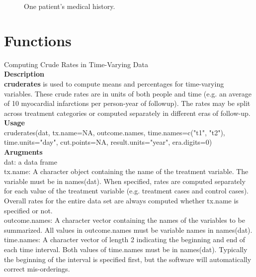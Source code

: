 \documentclass{article}
\begin{document}
\clearpage
\begin{figure}
\begin{center}
\caption{One patient's medical history.}
\label{imagraph}
\end{center}
\end{figure}


\section{Functions}

\huge{Computing Crude Rates in Time-Varying Data}\\

\large{\textbf{Description}}\\

\textbf{cruderates} is used to compute means and percentages for time-varying variables.  These crude rates are in units of both people and time (e.g. an average of 10 myocardial infarctions per person-year of followup).  The rates may be split across treatment categories or computed separately in different eras of follow-up.\\

\large{\textbf{Usage}}\\

cruderates(dat, tx.name=NA, outcome.names, time.names=c("t1", "t2"), time.units="day", cut.points=NA, result.units="year", era.digits=0)\\

\textbf{Arugments}\\

dat:  a data frame\\

tx.name:  A character object containing the name of the treatment variable.  The variable must be in names(dat).  When specified, rates are computed separately for each value of the treatment variable (e.g. treatment cases and control cases).  Overall rates for the entire data set are always computed whether tx.name is specified or not.\\

outcome.names:  A character vector containing the names of the variables to be summarized.  All values in outcome.names must be variable names in names(dat).\\

time.names:  A character vector of length 2 indicating the beginning and end of each time interval.  Both values of time.names must be in names(dat).  Typically the beginning of the interval is specified first, but the software will automatically correct mis-orderings.\\
\end{document}
